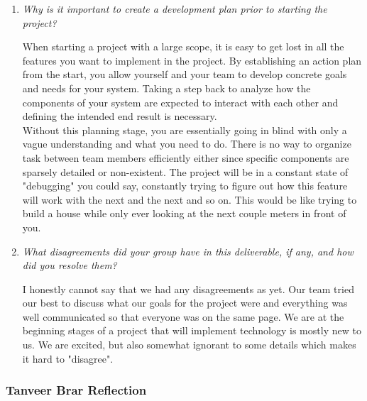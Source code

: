 \documentclass{article}
\begin{document}
\begin{enumerate}

  \item \textit{Why is it important to create a development plan
    prior to starting the project?}

    When starting a project with a large scope, it is easy to get
    lost in all the features you want to implement in the project.
    By establishing an action plan from the start, you allow yourself
    and your team to develop concrete goals and needs for your
    system. Taking a step back to analyze how the components of your
    system are expected to interact with each other and defining the
    intended end result is necessary.\\

    Without this planning stage, you are essentially going in blind
    with only a vague understanding and what you need to do. There is
    no way to organize task between team members efficiently either
    since specific components are sparsely detailed or non-existent. The
    project will be in a constant state of "debugging" you could say,
    constantly trying to figure out how this feature will work with the
    next and the next and so on. This would be like trying to build a
    house while only ever looking at the next couple meters in front of you.

  \item \textit{What disagreements did your group have in this
    deliverable, if any, and how did you resolve them?}

    I honestly cannot say that we had any disagreements as yet. Our
    team tried our best to discuss what our goals for the project were and
    everything was well communicated so that everyone was on the same
    page. We are at the beginning stages of a project that will implement
    technology is mostly new to us. We are excited, but also somewhat
    ignorant to some details which makes it hard to "disagree".

\end{enumerate}

\subsubsection*{Tanveer Brar Reflection}
\end{document}
